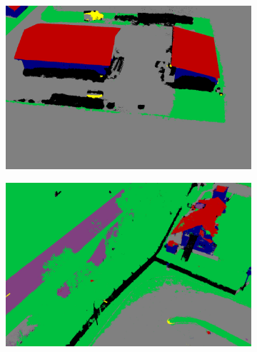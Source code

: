\begin{figure}[H]
\begin{subfigure}[tbp]{0.24\columnwidth}
           \caption[]{}
           {{\small }}    
           \label{fig:4e}
       \end{subfigure}       
       \begin{subfigure}[tbp]{0.24\columnwidth}  
           \centering 
           \includegraphics[width=\textwidth]{segment/fin_seg2.png}
           \caption[]{}%
           {{\small }}    
           \label{fig:4f}
       \end{subfigure}
       \hfill
       \begin{subfigure}[tbp]{0.24\columnwidth}  
           \centering 
           \includegraphics[width=\textwidth]{segment/kiga_seg1.png}
           \caption[]{}
           {{\small }}    
           \label{fig:4g}
       \end{subfigure}       
       \begin{subfigure}[tbp]{0.24\columnwidth}  
           \centering 

\end{subfigure}
\end{figure}
